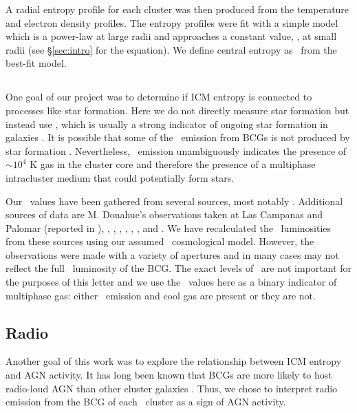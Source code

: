\documentclass[12pt,preprint]{aastex}
\begin{document}
A radial entropy profile for each cluster was then produced from the
temperature and electron density profiles. The entropy profiles were
fit with a simple model which is a power-law at large radii and
approaches a constant value, \kna, at small radii (see
\S\ref{sec:intro} for the equation). We define central entropy as
\kna\ from the best-fit model.

\subsection{\halpha}
\label{sec:ha}

One goal of our project was to determine if ICM entropy is connected
to processes like star formation. Here we do not directly measure star
formation but instead use \halpha, which is usually a strong indicator
of ongoing star formation in galaxies \citep{kennicuttrelation}. It is
possible that some of the \halpha\ emission from BCGs is not produced
by star formation \citep{begelman90, sparks04, rusz08,
 ferland08}. Nevertheless, \halpha\ emission unambiguously indicates
the presence of $\sim 10^4$ K gas in the cluster core and therefore
the presence of a multiphase intracluster medium that could
potentially form stars.

Our \halpha\ values have been gathered from several sources, most
notably \cite{crawford99}. Additional sources of data are M. Donahue's
observations taken at Las Campanas and Palomar (reported in
\citealt{accept}), \cite{heckman89}, \cite{dsg92}, \cite{lawrence96},
\cite{1996AJ....112.1390V}, \cite{white97},
\cite{2005MNRAS.363..216C}, and \cite{quillen08}. We have recalculated
the \halpha\ luminosities from these sources using our assumed
\LCDM\ cosmological model.  However, the observations were made with a
variety of apertures and in many cases may not reflect the full
\halpha\ luminosity of the BCG. The exact levels of \lha\ are not
important for the purposes of this letter and we use the \lha\ values
here as a binary indicator of multiphase gas: either \halpha\ emission
and cool gas are present or they are not.

\subsection{Radio}
\label{sec:radio}

Another goal of this work was to explore the relationship between ICM
entropy and AGN activity. It has long been known that BCGs are more
likely to host radio-loud AGN than other cluster galaxies
\citep{burns81, valentijn83, burns90}. Thus, we chose to interpret
radio emission from the BCG of each \accept\ cluster as a sign of AGN
activity.
\end{document}
